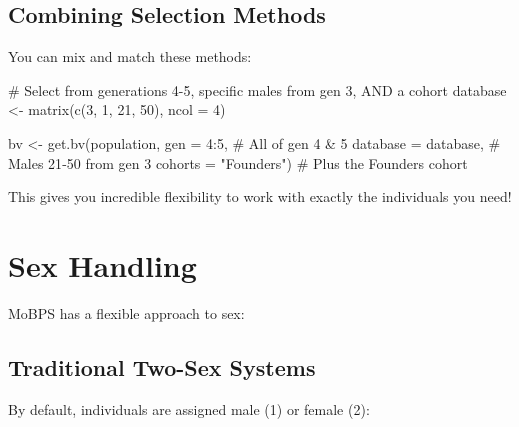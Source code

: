 \documentclass[
  letterpaper,
]{book}
\newenvironment{Shaded}{\begin{snugshade}}{\end{snugshade}}
\newcommand{\AttributeTok}[1]{\textcolor[rgb]{0.40,0.45,0.13}{#1}}
\newcommand{\CommentTok}[1]{\textcolor[rgb]{0.37,0.37,0.37}{#1}}
\newcommand{\DecValTok}[1]{\textcolor[rgb]{0.68,0.00,0.00}{#1}}
\newcommand{\FunctionTok}[1]{\textcolor[rgb]{0.28,0.35,0.67}{#1}}
\newcommand{\NormalTok}[1]{\textcolor[rgb]{0.00,0.23,0.31}{#1}}
\newcommand{\OtherTok}[1]{\textcolor[rgb]{0.00,0.23,0.31}{#1}}
\newcommand{\SpecialCharTok}[1]{\textcolor[rgb]{0.37,0.37,0.37}{#1}}
\newcommand{\StringTok}[1]{\textcolor[rgb]{0.13,0.47,0.30}{#1}}
\begin{document}
\subsection{Combining Selection
Methods}\label{combining-selection-methods}

You can mix and match these methods:

\begin{Shaded}
\begin{Highlighting}[]
\CommentTok{\# Select from generations 4{-}5, specific males from gen 3, AND a cohort}
\NormalTok{database }\OtherTok{\textless{}{-}} \FunctionTok{matrix}\NormalTok{(}\FunctionTok{c}\NormalTok{(}\DecValTok{3}\NormalTok{, }\DecValTok{1}\NormalTok{, }\DecValTok{21}\NormalTok{, }\DecValTok{50}\NormalTok{), }\AttributeTok{ncol =} \DecValTok{4}\NormalTok{)}

\NormalTok{bv }\OtherTok{\textless{}{-}} \FunctionTok{get.bv}\NormalTok{(population,}
             \AttributeTok{gen =} \DecValTok{4}\SpecialCharTok{:}\DecValTok{5}\NormalTok{,              }\CommentTok{\# All of gen 4 \& 5}
             \AttributeTok{database =}\NormalTok{ database,     }\CommentTok{\# Males 21{-}50 from gen 3}
             \AttributeTok{cohorts =} \StringTok{"Founders"}\NormalTok{)    }\CommentTok{\# Plus the Founders cohort}
\end{Highlighting}
\end{Shaded}

This gives you incredible flexibility to work with exactly the
individuals you need!

\section{Sex Handling}\label{sec-sex}

MoBPS has a flexible approach to sex:

\subsection{Traditional Two-Sex
Systems}\label{traditional-two-sex-systems}

By default, individuals are assigned male (1) or female (2):
\end{document}
